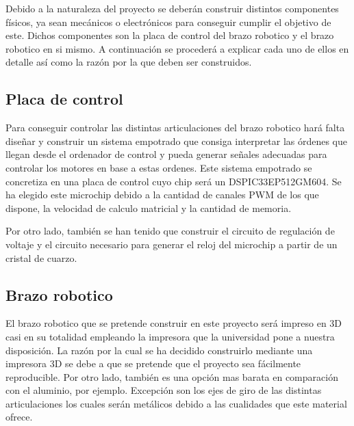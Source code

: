 Debido a la naturaleza del proyecto se deberán construir distintos componentes físicos, ya sean mecánicos o electrónicos para conseguir cumplir el objetivo de este. Dichos componentes son la placa de control del brazo robotico y el brazo robotico en si mismo. A continuación se procederá a explicar cada uno de ellos en detalle así como la razón por la que deben ser construidos.

\subsection{Placa de control}

Para conseguir controlar las distintas articulaciones del brazo robotico hará falta diseñar y construir un sistema empotrado que consiga interpretar las órdenes que llegan desde el ordenador de control y pueda generar señales adecuadas para controlar los motores en base a estas ordenes. Este sistema empotrado se concretiza en una placa de control cuyo chip será un DSPIC33EP512GM604. Se ha elegido este microchip debido a la cantidad de canales PWM de los que dispone, la velocidad de calculo matricial y la cantidad de memoria.

Por otro lado, también se han tenido que construir el circuito de regulación de voltaje y el circuito necesario para generar el reloj del microchip a partir de un cristal de cuarzo.

\subsection{Brazo robotico}

El brazo robotico que se pretende construir en este proyecto será impreso en 3D casi en su totalidad empleando la impresora que la universidad pone a nuestra disposición. La razón por la cual se ha decidido construirlo mediante una impresora 3D se debe a que se pretende que el proyecto sea fácilmente reproducible. Por otro lado, también es una opción mas barata en comparación con el aluminio, por ejemplo. Excepción son los ejes de giro de las distintas articulaciones los cuales serán metálicos debido a las cualidades que este material ofrece. 

